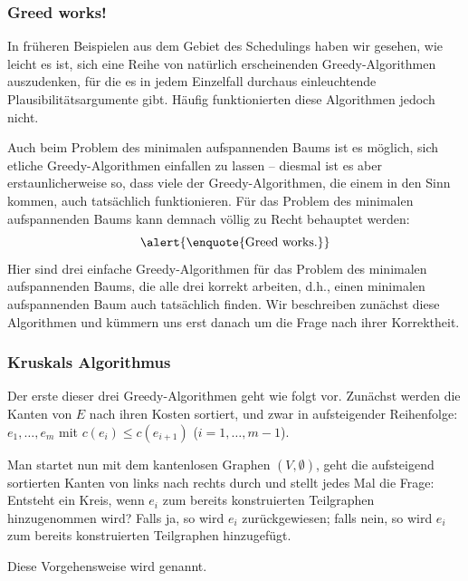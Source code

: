 \documentclass[smaller]{beamer}
\begin{document}
\begin{frame}
 \frametitle{Greed works!}
In früheren Beispielen aus dem Gebiet des Schedulings haben wir gesehen, wie leicht es ist, \alert{sich eine Reihe von natürlich erscheinenden Greedy-Algorithmen auszudenken, für die es in jedem Einzelfall durchaus einleuchtende Plausibilitätsargumente gibt.} Häufig funktionierten diese Algorithmen jedoch nicht. \\ \vspace*{0.2cm}

Auch beim Problem des minimalen aufspannenden Baums ist es möglich, sich etliche Greedy-Algorithmen einfallen zu lassen -- \alert{diesmal ist es aber erstaunlicherweise so, dass viele der Greedy-Algorithmen, die einem in den Sinn kommen, auch tatsächlich funktionieren.} Für das Problem des minimalen aufspannenden Baums kann demnach völlig zu Recht behauptet werden: 
\begin{equation*}
\alert{\text{\enquote{Greed works.}}}
\end{equation*}
Hier sind \alert{drei einfache Greedy-Algorithmen} für das Problem des minimalen aufspannenden Baums, die alle drei korrekt arbeiten, d.h., einen minimalen aufspannenden Baum auch tatsächlich finden. Wir beschreiben zunächst diese Algorithmen und kümmern uns erst danach um die Frage nach ihrer Korrektheit.
\end{frame}

\begin{frame}
\frametitle{Kruskals Algorithmus}
Der erste dieser drei Greedy-Algorithmen geht wie folgt vor. Zunächst werden die Kanten von $E$ nach ihren Kosten sortiert, und zwar in aufsteigender Reihenfolge: $e_1,\ldots,e_m$ mit $c(e_i) \leq c(e_{i+1})$ ($i = 1,\ldots,m-1$). \\ \vspace*{0.2cm}

Man startet nun mit dem kantenlosen Graphen $(V, \emptyset)$, geht die aufsteigend sortierten Kanten von links nach rechts durch und stellt jedes Mal die Frage:
\alert{Entsteht ein Kreis, wenn $e_i$ zum bereits konstruierten Teilgraphen hinzugenommen wird?} Falls ja, so wird $e_i$ zurückgewiesen; falls nein, so wird $e_i$ zum bereits konstruierten Teilgraphen hinzugefügt. \\ \vspace*{0.2cm}

Diese Vorgehensweise wird  genannt.
\end{frame}
\end{document}
